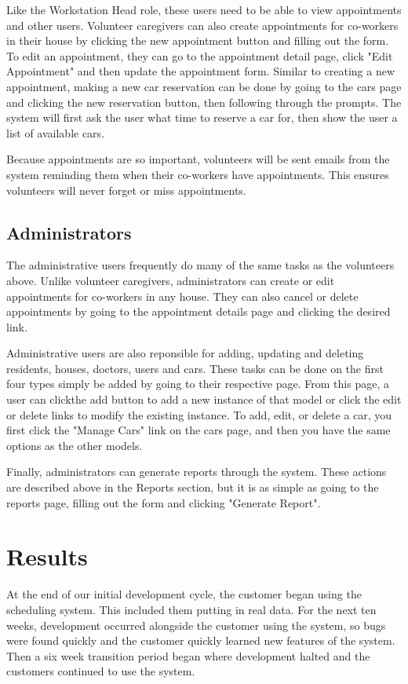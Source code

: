 \documentclass{sig-alternate}
\begin{document}
Like the Workstation Head role, these users need to be able to view appointments and other users. Volunteer caregivers can also create appointments for co-workers in their house by clicking the new appointment button and filling out the form. To edit an appointment, they can go to the appointment detail page, click "Edit Appointment" and then update the appointment form. Similar to creating a new appointment, making a new car reservation can be done by going to the cars page and clicking the new reservation button, then following through the prompts. The system will first ask the user what time to reserve a car for, then show the user a list of available cars.

Because appointments are so important, volunteers will be sent emails from the system reminding them when their co-workers have appointments. This ensures volunteers will never forget or miss appointments.

\subsection{Administrators}
The administrative users frequently do many of the same tasks as the volunteers above. Unlike volunteer caregivers, administrators can create or edit appointments for co-workers in any house. They can also cancel or delete appointments by going to the appointment details page and clicking the desired link.

Administrative users are also reponsible for adding, updating and deleting residents, houses, doctors, users and cars. These tasks can be done on the first four types simply be added by going to their respective page. From this page, a user can clickthe add button to add a new instance of that model or click the edit or delete links to modify the existing instance. To add, edit, or delete a car, you first click the "Manage Cars" link on the cars page, and then you have the same options as the other models.

Finally, administrators can generate reports through the system. These actions are described above in the Reports section, but it is as simple as going to the reports page, filling out the form and clicking "Generate Report".

\section{Results}
At the end of our initial development cycle, the customer began using the scheduling system. This included them putting in real data. For the next ten weeks, development occurred alongside the customer using the system, so bugs were found quickly and the customer quickly learned new features of the system. Then a six week transition period began where development halted and the customers continued to use the system.
\end{document}
